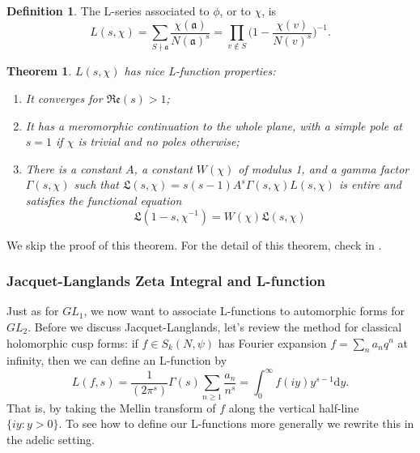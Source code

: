 \documentclass[12pt,a4paper,english]{article}
\theoremstyle{plain}
\newtheorem{thm}{Theorem}[section]
\theoremstyle{definition}
\newtheorem{defi}{Definition}
\begin{document}
\begin{defi}
The L-series associated to $\phi$, or to $\chi$, is 
\begin{equation*}
    L(s, \chi)=\sum_{S\nmid\mathfrak{a}}\frac{\chi(\mathfrak{a})}{N(\mathfrak{a})^{s}}=\prod_{v\not\in S}\bigg(1-\frac{\chi(v)}{N(v)^{s}}\bigg)^{-1}.
\end{equation*}
\end{defi}
\begin{thm}
$L(s,\chi)$ has nice L-function properties:
\begin{enumerate}
    \item It converges for $\mathfrak{Re}(s)>1$;
    \item It has a meromorphic continuation to the whole plane, with a simple pole at $s=1$ if $\chi$ is trivial and no poles otherwise;
    \item There is a constant $A$, a constant $W(\chi)$ of modulus 1, and a gamma factor $\Gamma(s,\chi)$ such that $\mathfrak{L}(s,\chi)=s(s-1)A^{s}\Gamma(s,\chi)L(s,\chi)$ is entire and satisfies the functional equation
    \begin{equation*}
        \mathfrak{L}(1-s,\chi^{-1})=W(\chi)\mathfrak{L}(s,\chi)
    \end{equation*}
\end{enumerate}
\end{thm}
We skip the proof of this theorem. For the detail of this theorem, check in \cite{gelbart2016automorphic}.
\subsubsection{Jacquet-Langlands Zeta Integral and L-function\cite{langlands1970automorphic}}
Just as  for $GL_{1}$, we now want to associate L-functions to automorphic forms for $GL_{2}$. Before we discuss Jacquet-Langlands, let's review the method for classical holomorphic cusp forms: if $f\in S_{k}(N, \psi)$ has Fourier expansion $f=\sum_{n}a_{n}q^{n}$ at infinity, then we can define an L-function by 
\begin{equation*}
    L(f,s)=\frac{1}{(2\pi^{s})}\Gamma(s)\sum_{n\geq 1}\frac{a_{n}}{n^{s}}=\int^{\infty}_{0}f(iy)y^{s-1}
    \text{d}y.
\end{equation*}
That is, by taking the Mellin transform of $f$ along the vertical half-line $\{iy:y>0\}$. To see how to define our L-functions more generally we rewrite this in the adelic setting.
\end{document}
